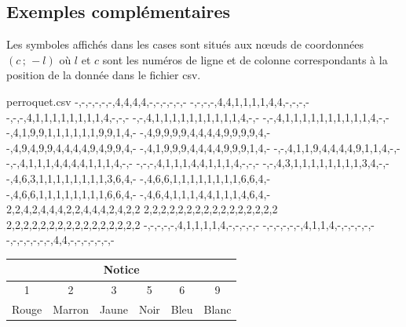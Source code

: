 \documentclass{article}
\begin{document}
\subsection{Exemples complémentaires}

\begin{codeinfo}
Les symboles affichés dans les cases sont situés aux nœuds de coordonnées $(c\,;\,-l)$ où $l$ et $c$ sont les numéros de ligne et de colonne correspondants à la position de la donnée dans le fichier \textsf{csv}.
\end{codeinfo}

\begin{codesortie}
\begin{filecontents*}[overwrite]{perroquet.csv}
-,-,-,-,-,-,4,4,4,4,-,-,-,-,-,-
-,-,-,-,4,4,1,1,1,1,4,4,-,-,-,-
-,-,-,4,1,1,1,1,1,1,1,1,4,-,-,-
-,-,4,1,1,1,1,1,1,1,1,1,1,4,-,-
-,-,4,1,1,1,1,1,1,1,1,1,1,4,-,-
-,4,1,9,9,1,1,1,1,1,1,9,9,1,4,-
-,4,9,9,9,9,4,4,4,4,9,9,9,9,4,-
-,4,9,4,9,9,4,4,4,4,9,4,9,9,4,-
-,4,1,9,9,9,4,4,4,4,9,9,9,1,4,-
-,-,4,1,1,9,4,4,4,4,9,1,1,4,-,-
-,-,4,1,1,1,4,4,4,4,1,1,1,4,-,-
-,-,-,4,1,1,1,4,4,1,1,1,4,-,-,-
-,-,4,3,1,1,1,1,1,1,1,1,3,4,-,-
-,4,6,3,1,1,1,1,1,1,1,1,3,6,4,-
-,4,6,6,1,1,1,1,1,1,1,1,6,6,4,-
-,4,6,6,1,1,1,1,1,1,1,1,6,6,4,-
-,4,6,4,1,1,1,4,4,1,1,1,4,6,4,-
2,2,4,2,4,4,4,2,2,4,4,4,2,4,2,2
2,2,2,2,2,2,2,2,2,2,2,2,2,2,2,2
2,2,2,2,2,2,2,2,2,2,2,2,2,2,2,2
-,-,-,-,-,4,1,1,1,1,4,-,-,-,-,-
-,-,-,-,-,-,4,1,1,4,-,-,-,-,-,-
-,-,-,-,-,-,-,4,4,-,-,-,-,-,-,-
\end{filecontents*}

\begin{center}
	\renewcommand\arraystretch{1.25}
	\begin{tabular}{|c|c|c|c|c|c|}
		\hline
		\multicolumn{6}{|c|}{Notice} \\ \hline
		1 & 2 & 3 & 5 & 6 & 9 \\ \hline
		Rouge & Marron & Jaune & Noir & Bleu & Blanc \\ \hline
	\end{tabular}
\end{center}

\begin{center}
	\begin{tikzpicture}[x=0.35cm,y=0.35cm]
		\PLpixelart[codes=123469,style=\ttfamily]{perroquet.csv}
	\end{tikzpicture}
	\begin{tikzpicture}[x=0.35cm,y=0.35cm]
		\PLpixelart[codes=123469,couleurs={Red,Brown,Yellow,Black,Blue,White},correction]{perroquet.csv}
	\end{tikzpicture}
\end{center}


\end{codesortie}
\end{document}
